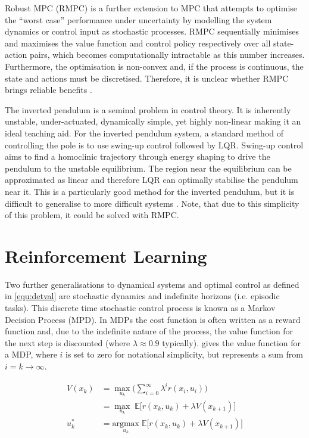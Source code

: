 \documentclass[../main.tex]{subfiles}
\begin{document}
Robust MPC (RMPC) is a further extension to MPC that attempts to optimise the ``worst case'' performance under uncertainty by modelling the system dynamics or control input as stochastic processes. RMPC sequentially minimises and maximises the value function and control policy respectively over all state-action pairs, which becomes computationally intractable as this number increases. Furthermore, the optimisation is non-convex and, if the process is continuous, the state and actions must be discretised. Therefore, it is unclear whether RMPC brings reliable benefits \cite{rmpc}.

The inverted pendulum is a seminal problem in control theory. It is inherently unstable, under-actuated, dynamically simple, yet highly non-linear making it an ideal teaching aid. For the inverted pendulum system, a standard method of controlling the pole is to use swing-up control followed by LQR. Swing-up control aims to find a homoclinic trajectory through energy shaping to drive the pendulum to the unstable equilibrium. The region near the equilibrium can be approximated as linear and therefore LQR can optimally stabilise the pendulum near it. This is a particularly good method for the inverted pendulum, but it is difficult to generalise to more difficult systems \cite{invpen}. Note, that due to this simplicity of this problem, it could be solved with RMPC.

\section{Reinforcement Learning}
Two further generalisations to dynamical systems and optimal control as defined in \cref{equ:detval} are stochastic dynamics and indefinite horizons (i.e. episodic tasks). This discrete time stochastic control process is known as a Markov Decision Process (MPD). In MDPs the cost function is often written as a reward function and, due to the indefinite nature of the process, the value function for the next step is discounted (where $\lambda \approx 0.9$ typically).  gives the value function for a MDP, where $i$ is set to zero for notational simplicity, but represents a sum from $i=k \rightarrow \infty$. 

\begin{align}
    \label{equ:mdpval} 
    V(x_k) & = \underset{u_k}{\max} \bigg( \sum_{i=0}^{\infty} \lambda^{i} r(x_i, u_i) \bigg) \\ 
    & = \underset{u_k}{\max} \; \mathbb{E} \Big[ r(x_k, u_k) + \lambda V(x_{k+1}) \Big] \\
    u^{*}_k & = \underset{u_k}{\text{argmax}}\; \mathbb{E} \Big[ r(x_k, u_k) + \lambda V(x_{k+1}) \Big]
\end{align}
\end{document}
